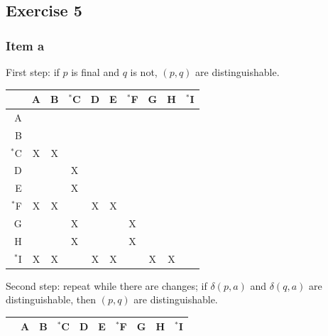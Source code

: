 \documentclass[docid=TP07]{tcom_TP}
\begin{document}
{\subsection{Exercise 5}
\subsubsection{Item a}
First step: if $p$ is final and $q$ is not, $(p,q)$ are distinguishable.
\begin{center} \begin{tabular}{r || c | c | c | c | c | c | c | c | c}
	   & A  & B  & $^*$C & D  & E  & $^*$F & G  & H  & $^*$I \\ \hline \hline
	A  & \cellcolor{gray} & \cellcolor{gray} & \cellcolor{gray} & \cellcolor{gray} & \cellcolor{gray} & \cellcolor{gray} & \cellcolor{gray} & \cellcolor{gray} & \cellcolor{gray} \\ \hline
	B  &    & \cellcolor{gray} & \cellcolor{gray} & \cellcolor{gray} & \cellcolor{gray} & \cellcolor{gray} & \cellcolor{gray} & \cellcolor{gray} & \cellcolor{gray} \\ \hline
	$^*$C & X  & X  & \cellcolor{gray} & \cellcolor{gray} & \cellcolor{gray} & \cellcolor{gray} & \cellcolor{gray} & \cellcolor{gray} & \cellcolor{gray} \\ \hline
	D  &    &    & X  & \cellcolor{gray} & \cellcolor{gray} & \cellcolor{gray} & \cellcolor{gray} & \cellcolor{gray} & \cellcolor{gray} \\ \hline
	E  &    &    & X  &    & \cellcolor{gray} & \cellcolor{gray} & \cellcolor{gray} & \cellcolor{gray} & \cellcolor{gray} \\ \hline
	$^*$F & X  & X  &    & X  & X  & \cellcolor{gray} & \cellcolor{gray} & \cellcolor{gray} & \cellcolor{gray} \\ \hline
	G  &    &    & X  &    &    & X  & \cellcolor{gray} & \cellcolor{gray} & \cellcolor{gray} \\ \hline
	H  &    &    & X  &    &    & X  &    & \cellcolor{gray} & \cellcolor{gray} \\ \hline
	$^*$I & X  & X  &    & X  & X  &    & X  & X  & \cellcolor{gray} 
\end{tabular} \end{center}
Second step: repeat while there are changes; if $\delta(p,a)$ and $\delta(q,a)$ are distinguishable, then $(p,q)$ are distinguishable.
\begin{center} \begin{tabular}{r || c | c | c | c | c | c | c | c | c}
	   & A  & B  & $^*$C & D  & E  & $^*$F & G  & H  & $^*$I \\ \hline \hline

\end{tabular}
\end{center}}
\end{document}

